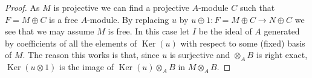 \documentclass[10pt,a4paper]{amsart}
\theoremstyle{plain}
\theoremstyle{definition}
\theoremstyle{remark}
\numberwithin{equation}{subsection}
\def\Ker{\mathop{\mathrm{Ker}}}
\begin{document}
\begin{proof}
As $M$ is projective we can find a projective $A$-module $C$
such that $F = M \oplus C$ is a free $A$-module.
By replacing $u$ by $u \oplus 1 : F = M \oplus C \to N \oplus C$
we see that we may assume $M$ is free. In this case let $I$ be
the ideal of $A$ generated by coefficients of all the elements of
$\Ker(u)$ with respect to some (fixed) basis of $M$.
The reason this works is that, since $u$ is surjective and
$\otimes_A B$ is right exact, $\Ker(u \otimes 1)$ is
the image of $\Ker(u) \otimes_A B$ in $M \otimes_A B$.
\end{proof}
\end{document}
